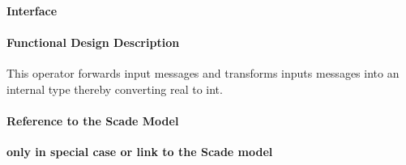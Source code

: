 \paragraph{Interface}

\paragraph{Functional Design Description}
This operator forwards input messages and transforms inputs messages into an internal type thereby converting real to int.
  
\paragraph{Reference to the Scade Model}
\textbf{only in special case or link to the Scade model}